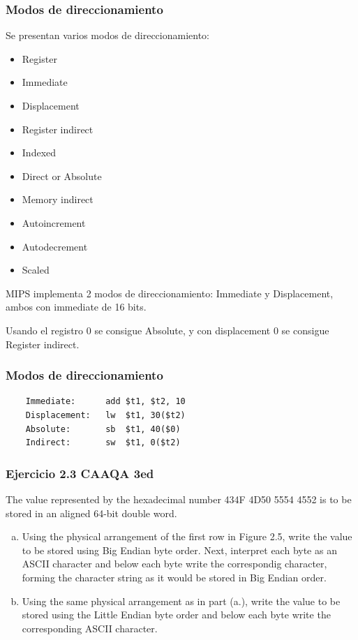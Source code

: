 \documentclass{beamer}
\begin{document}
\begin{frame}
 \frametitle{Modos de direccionamiento}
Se presentan varios modos de direccionamiento: 
\begin{multicols}{2}
\begin{itemize}
 \item Register
 \item Immediate
 \item Displacement
 \item Register indirect
 \item Indexed
 \item Direct or Absolute
 \item Memory indirect
 \item Autoincrement
 \item Autodecrement
 \item Scaled
 \end{itemize}
\end{multicols}

MIPS implementa 2 modos de direccionamiento: Immediate y Displacement, ambos con immediate de 16 bits.
    
Usando el registro 0 se consigue Absolute, y con displacement 0 se consigue Register indirect.
\end{frame}

\begin{frame}[fragile]
\frametitle{Modos de direccionamiento}

\begin{lstlisting}
    Immediate:		add	$t1, $t2, 10	
    Displacement:	lw	$t1, 30($t2)
    Absolute:		sb	$t1, 40($0)
    Indirect:		sw	$t1, 0($t2)
\end{lstlisting}
\end{frame}

\begin{frame}
 \frametitle{Ejercicio 2.3 CAAQA 3ed}
 The value represented by the hexadecimal number 434F 4D50 5554 4552 is to be stored in an aligned 64-bit double word.
 
 \begin{enumerate}[a.]
  \item Using the physical arrangement of the first row in Figure 2.5, write the value to be stored using Big Endian byte order. Next, interpret each byte as an ASCII character and below each byte write the correspondig character, forming the character string as it would be stored in Big Endian order.
  
  \item Using the same physical arrangement as in part (a.), write the value to be stored using the Little Endian byte order and below each byte write the corresponding ASCII character.
 \end{enumerate}

\end{frame}
\end{document}
